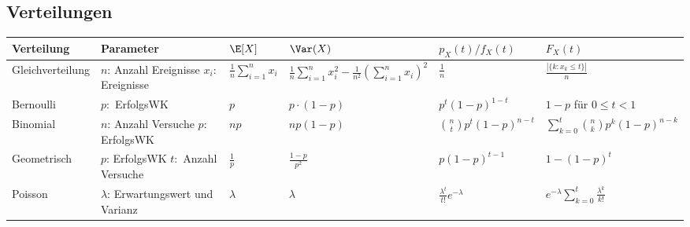 \renewcommand*{\arraystretch}{2}
\begin{center}
\begin{table*}
	\subsection{Verteilungen}
	
		\begin{tabularx}{\textwidth}{llXXXX}
			\toprule
			Verteilung       & Parameter                                   & \( \E[X] \) & \( \Var(X) \)       & \( p_X(t)/f_X(t) \)         & \( F_X(t) \)                     \\
			\midrule
			Gleichverteilung & \makecell[l]{\( n \): Anzahl Ereignisse                                                                                                   \\ \( x_i \): Ereignisse} & \( \frac{1}{n} \sum_{i=1}^{n} x_i \) & \( \frac{1}{n} \sum_{i=1}^{n} x_i^2 - \frac{1}{n^2} \left(\sum_{i=1}^{n} x_i \right)^2 \) & \( \frac{1}{n} \) & \( \frac{|\{k:x_k \leq t\}|}{n} \) \\
	
			Bernoulli        & \( p: \) ErfolgsWK                          & \( p \)     & \( p \cdot (1-p) \) & \( p^t(1-p)^{1-t} \) & \( 1-p \) für \( 0 \leq t < 1 \) \\
	
			Binomial         & \makecell[l] {\( n \): Anzahl Versuche                                                                                                    \\ \( p: \) ErfolgsWK } & \( np \) & \( np(1-p) \) & \( \binom{n}{t}p^t(1-p)^{n-t} \) & \( \sum_{k=0}^{t} \binom{n}{k} p^k(1-p)^{n-k} \)  \\
	
			Geometrisch      & \makecell[l] { \( p \): ErfolgsWK                                                                                                         \\ \( t: \) Anzahl Versuche} & \( \frac{1}{p} \) & \( \frac{1-p}{p^2} \) & \( p(1-p)^{t-1} \) & \( 1-(1-p)^t\) \\
	
			Poisson          & \makecell[l]{ \( \lambda \): Erwartungswert                                                                                               \\ und Varianz} & \( \lambda \) & \( \lambda \) & \( \frac{\lambda^t}{t!}e^{-\lambda} \) & \( e^{-\lambda} \sum_{k=0}^{t} \frac{\lambda^{k}}{k!} \) \\
			

\end{tabularx}
\end{table*}
\end{center}
